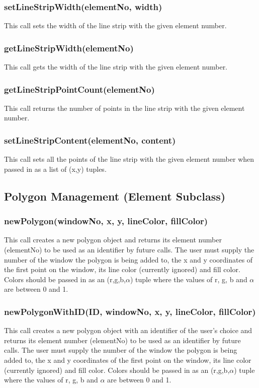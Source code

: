 \documentclass{acm_proc_article-sp}
\begin{document}
\subsubsection{setLineStripWidth(elementNo, width)}
This call sets the width of the line strip with the given element number.
\subsubsection{getLineStripWidth(elementNo)}
This call gets the width of the line strip with the given element number.
\subsubsection{getLineStripPointCount(elementNo)}
This call returns the number of points in the line strip with the given element number.
\subsubsection{setLineStripContent(elementNo, content)}
This call sets all the points of the line strip with the given element number when passed in as a list of (x,y) tuples.
\subsection{Polygon Management (Element Subclass)}
\subsubsection{newPolygon(windowNo, x, y, lineColor, fillColor)}
This call creates a new polygon object and returns its element number (elementNo) to be used as an identifier by future calls. The user must supply the number of the window the polygon is being added to, the x and y coordinates of the first point on the window, its line color (currently ignored) and fill color. Colors should be passed in as an (r,g,b,$\alpha$) tuple where the values of r, g, b and $\alpha$ are between 0 and 1.
\subsubsection{newPolygonWithID(ID, windowNo, x, y, lineColor, fillColor)}
This call creates a new polygon object with an identifier of the user's choice and returns its element number (elementNo) to be used as an identifier by future calls. The user must supply the number of the window the polygon is being added to, the x and y coordinates of the first point on the window, its line color (currently ignored) and fill color. Colors should be passed in as an (r,g,b,$\alpha$) tuple where the values of r, g, b and $\alpha$ are between 0 and 1.
\end{document}
